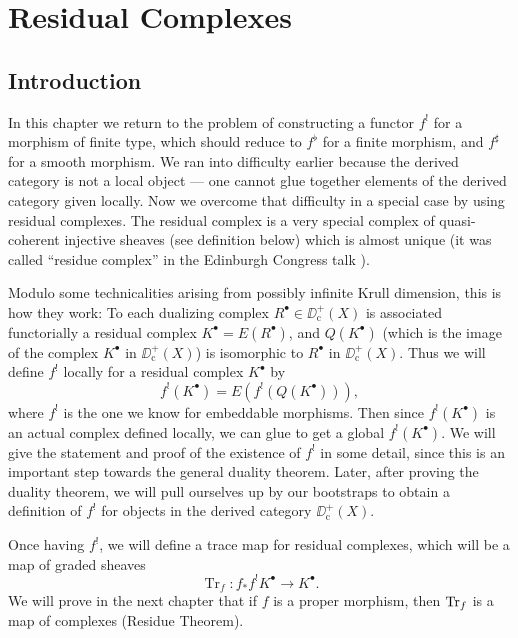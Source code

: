 
\chapter{Residual Complexes}
\setcounter{section}{-1}
\begingroup
\setlength{\emergencystretch}{2em}

\section{Introduction}\label{sec:6.0}

In this chapter we return to the problem of constructing a functor $f^{!}$ for a morphism of finite type, which should reduce to $f^{\flat}$ for a finite morphism, and $f^{\sharp}$ for a smooth morphism. We ran into difficulty earlier  because the derived category is not a local object — one cannot glue together elements of the derived category given locally. Now we overcome that difficulty in a special case by using residual complexes. The residual complex is a very special complex of quasi-coherent injective sheaves (see definition below) which is almost unique (it was called ``residue complex'' in the Edinburgh Congress talk \cite{9}).

Modulo some technicalities arising from possibly infinite Krull dimension, this is how they work: To each dualizing complex $R^\bullet\in\DD^+_{\mathrm{c}}(X)$ is associated functorially a residual complex $K^\bullet = E(R^\bullet)$, and $Q(K^\bullet)$ (which is the image of the complex $K^\bullet$ in $\DD^+_{\mathrm{c}}(X)$) is isomorphic to $R^\bullet$ in $\DD^+_{\mathrm{c}}(X)$. Thus we will define $f^{!}$ locally for a residual complex $K^\bullet$ by
\[
f^{!}(K^\bullet) = E(f^{!}(Q(K^\bullet))),
\]
where $f^{!}$ is the one we know for embeddable morphisms. Then since $f^{!}(K^\bullet)$ is an actual complex defined locally, we can glue to get a global $f^{!}(K^\bullet)$. We will give the statement and proof of the existence of $f^{!}$ in some detail, since this is an important step towards the general duality theorem. Later, after proving the duality theorem, we will pull ourselves up by our bootstraps to obtain a definition of $f^{!}$ for objects in the derived category $\DD_{\mathrm{c}}^{+}(X)$.

Once having $f^{!}$, we will define a trace map for residual complexes, which will be a map of graded sheaves
\[
\operatorname{Tr}_{f}\colon f_{*}f^{!}K^{\bullet}\longrightarrow K^{\bullet}.
\]
We will prove in the next chapter that if $f$ is a proper morphism, then $\operatorname{Tr}_f$ is a map of complexes (Residue Theorem).

